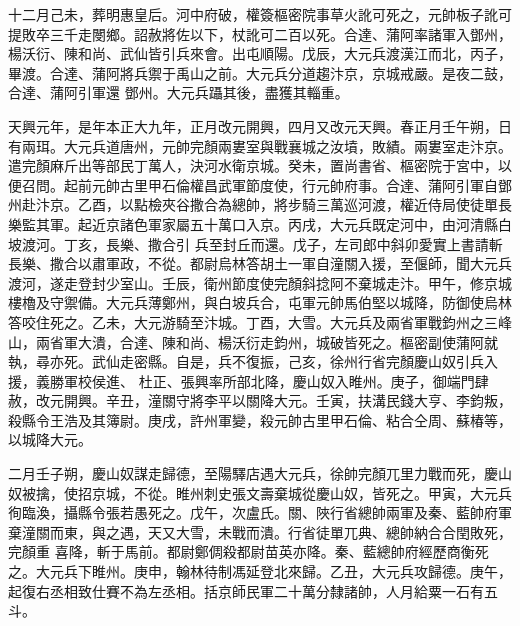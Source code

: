 \begin{pinyinscope}
 十二月己未，葬明惠皇后。河中府破，權簽樞密院事草火訛可死之，元帥板子訛可提敗卒三千走閿鄉。詔赦將佐以下，杖訛可二百以死。合達、蒲阿率諸軍入鄧州，楊沃衍、陳和尚、武仙皆引兵來會。出屯順陽。戊辰，大元兵渡漢江而北，丙子，畢渡。合達、蒲阿將兵禦于禹山之前。大元兵分道趨汴京，京城戒嚴。是夜二鼓，合達、蒲阿引軍還
 鄧州。大元兵躡其後，盡獲其輜重。



 天興元年，是年本正大九年，正月改元開興，四月又改元天興。春正月壬午朔，日有兩珥。大元兵道唐州，元帥完顏兩婁室與戰襄城之汝墳，敗績。兩婁室走汴京。遣完顏麻斤出等部民丁萬人，決河水衛京城。癸未，置尚書省、樞密院于宮中，以便召問。起前元帥古里甲石倫權昌武軍節度使，行元帥府事。合達、蒲阿引軍自鄧州赴汴京。乙酉，以點檢夾谷撒合為總帥，將步騎三萬巡河渡，權近侍局使徒單長樂監其軍。起近京諸色軍家屬五十萬口入京。丙戌，大元兵既定河中，由河清縣白坡渡河。丁亥，長樂、撒合引
 兵至封丘而還。戊子，左司郎中斜卯愛實上書請斬長樂、撒合以肅軍政，不從。都尉烏林答胡土一軍自潼關入援，至偃師，聞大元兵渡河，遂走登封少室山。壬辰，衛州節度使完顏斜捻阿不棄城走汴。甲午，修京城樓櫓及守禦備。大元兵薄鄭州，與白坡兵合，屯軍元帥馬伯堅以城降，防御使烏林答咬住死之。乙未，大元游騎至汴城。丁酉，大雪。大元兵及兩省軍戰鈞州之三峰山，兩省軍大潰，合達、陳和尚、楊沃衍走鈞州，城破皆死之。樞密副使蒲阿就執，尋亦死。武仙走密縣。自是，兵不復振，己亥，徐州行省完顏慶山奴引兵入援，義勝軍校侯進、
 杜正、張興率所部北降，慶山奴入睢州。庚子，御端門肆赦，改元開興。辛丑，潼關守將李平以關降大元。壬寅，扶溝民錢大亨、李鈞叛，殺縣令王浩及其簿尉。庚戌，許州軍變，殺元帥古里甲石倫、粘合仝周、蘇椿等，以城降大元。



 二月壬子朔，慶山奴謀走歸德，至陽驛店遇大元兵，徐帥完顏兀里力戰而死，慶山奴被擒，使招京城，不從。睢州刺史張文壽棄城從慶山奴，皆死之。甲寅，大元兵徇臨渙，攝縣令張若愚死之。戊午，次盧氏。關、陜行省總帥兩軍及秦、藍帥府軍棄潼關而東，與之遇，天又大雪，未戰而潰。行省徒單兀典、總帥納合合閏敗死，完顏重
 喜降，斬于馬前。都尉鄭倜殺都尉苗英亦降。秦、藍總帥府經歷商衡死之。大元兵下睢州。庚申，翰林待制馮延登北來歸。乙丑，大元兵攻歸德。庚午，起復右丞相致仕賽不為左丞相。括京師民軍二十萬分隸諸帥，人月給粟一石有五斗。




\end{pinyinscope}
